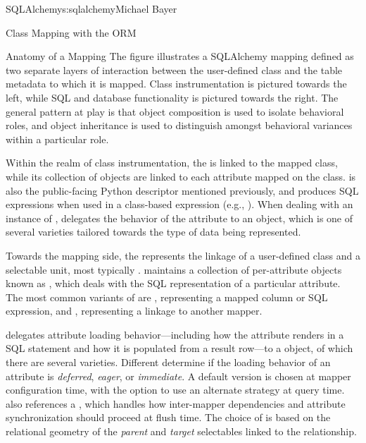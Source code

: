 \begin{aosachapter}{SQLAlchemy}{s:sqlalchemy}{Michael Bayer}
\begin{aosasect1}{Class Mapping with the ORM}
\begin{aosasect2}{Anatomy of a Mapping}
The figure illustrates a SQLAlchemy mapping defined as two separate layers
of interaction between the user-defined class and the table metadata to which
it is mapped.  Class instrumentation is pictured towards the left,
while SQL and database functionality is pictured towards the right.  The general pattern
at play is that object composition is used to isolate behavioral roles, and object inheritance
is used to distinguish amongst behavioral variances within a particular role.

Within the realm of class instrumentation, the  is linked to the mapped class, while
its collection of  objects are linked to each attribute mapped on the class.
 is also the public-facing Python descriptor mentioned previously, and
produces SQL expressions when used in a class-based expression (e.g., ).   When
dealing with an instance of ,  delegates the behavior of the
attribute to an  object, which is one of several varieties tailored towards the
type of data being represented.

Towards the mapping side, the  represents the linkage of a user-defined class and a selectable unit,
most typically .    maintains a collection
of per-attribute objects known as , which deals with the SQL
representation of a particular attribute.  The most common variants of  are , representing
a mapped column or SQL expression, and , representing a linkage to another mapper.

 delegates attribute loading behavior---including
how the attribute renders in a SQL statement and how it is populated from a result row---to 
a  object, of which
there are several varieties.   Different  determine if the loading behavior of
an attribute is \emph{deferred}, \emph{eager}, or \emph{immediate}.  A default version is chosen at mapper
configuration time, with the option to use an alternate strategy at query time.
 also references a ,
which handles how inter-mapper dependencies and attribute synchronization should proceed at flush time.
The choice of  is based on the relational geometry of the \emph{parent} and \emph{target}
selectables linked to the relationship.


\end{aosasect2}
\end{aosasect1}
\end{aosachapter}

